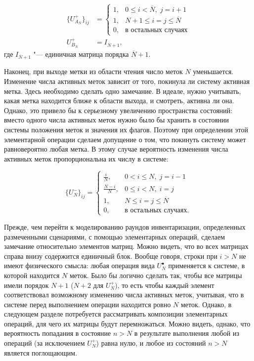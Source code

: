 \begin{equation}\label{eq:ch3_bg_tag_arrival}
	\begin{aligned}
		\{ U_{A_N}^+ \}_{ij} &= \begin{cases}
			1, & 0 \leqslant i < \overline{N}, \; j = i + 1\\
			1, & N+1 \leqslant i = j \leqslant \overline{N}\\
			0, & \text{в остальных случаях}
	 	\end{cases}\\
		U_{B_N}^+ &= I_{\overline{N}+1},
 	\end{aligned}
\end{equation}
где $I_{\overline{N}+1}$ "--- единичная матрица порядка $\overline{N}+1$.

Наконец, при выходе метки из области чтения число меток $N$ уменьшается. Изменение числа активных меток зависит от того, покинула ли систему активная метка. Здесь необходимо сделать одно замечание. В идеале, нужно учитывать, какая метка находится ближе к области выхода, и смотреть, активна ли она. Однако, это привело бы к серьезному увеличению пространства состояний: вместо одного числа активных меток нужно было бы хранить в состоянии системы положения меток и значения их флагов. Поэтому при определении этой элементарной операции сделаем допущение о том, что покинуть систему может равновероятно любая метка. В этому случае вероятность изменения числа активных меток пропорциональна их числу в системе:

\begin{equation}\label{eq:ch3_bg_tag_departure}
	\{ U_{N}^- \}_{ij} = \begin{cases}
		\frac{i}{N},     & 0 < i \leqslant N,\; j = i - 1\\
		\frac{N - i}{N}, & 0 \leqslant i < N,\; i = j\\
		1,               & N \leqslant i = j \leqslant \overline{N}\\
		0,               & \text{в остальных случаях.}
 	\end{cases}
\end{equation}

Прежде, чем перейти к моделированию раундов инвентаризации, определенных размеченными сценариями, с помощью элементарных операций, сделаем замечание относительно элементов матриц. Можно видеть, что во всех матрицах справа внизу содержится единичный блок. Вообще говоря, строки при $i > N$ не имеют физического смысла: любая операция вида $U^\bullet_N$ применяется к системе, в которой находится $N$ меток. Было бы логично сделать так, чтобы все матрицы имели порядок $N+1$ ($N+2$ для $U_N^+$), то есть чтобы каждый элемент соответствовал возможному изменению числа активных меток, учитывая, что в системе перед выполнением операции находится ровно $N$ меток. Однако, в следующем разделе потребуется рассматривать композиции элементарных операций, для чего их матрицы будут перемножаться. Можно видеть, однако, что вероятность попадания в состояние $n > N$ в результате выполнения любой из операций (за исключением $U_N^+$) равна нулю, и любое из состояний $n > N$ является поглощающим.




